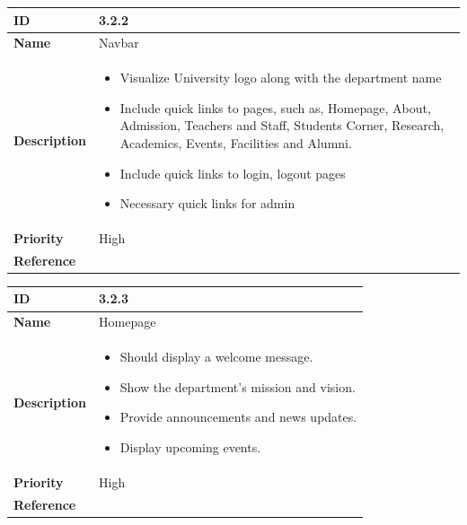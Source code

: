 \documentclass[11pt]{article}
\begin{document}
\vspace{0.5cm}

\begin{center}
  \begin{tabular}{ | >{\bfseries}m{5em} | m{10cm} |  } 
    \hline
    ID & 3.2.2\\  
    \hline
    Name & Navbar \\  
    \hline
    Description & 
    \begin{itemize}
        \item Visualize University logo along with the department name
        \item Include quick links to pages, such as, Homepage, About, Admission, Teachers and Staff, Students Corner, Research, Academics, Events, Facilities and Alumni.
        \item Include quick links to login, logout pages
        \item Necessary quick links for admin
    \end{itemize} \\ 
    \hline
    Priority & High\\
    \hline 
    Reference & \\
    \hline
  \end{tabular}
  \end{center}

\begin{center}
\begin{tabular}{ | >{\bfseries}m{5em} | m{10cm} |  } 
  \hline
  ID & 3.2.3\\  
  \hline
  Name & Homepage \\  
  \hline
  Description & 
  \begin{itemize}
      \item Should display a welcome message.
      \item Show the department’s mission and vision.
      \item Provide announcements and news updates.
      \item Display upcoming events.
  \end{itemize} \\ 
  \hline
  Priority & High\\
  \hline 
  Reference & \\
  \hline
\end{tabular}
\end{center}

\vspace{0.5cm}
\end{document}
